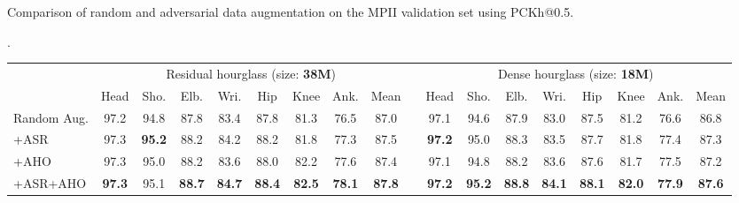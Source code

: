 \documentclass[10pt,twocolumn,letterpaper]{article}
\begin{document}
\centering
\caption{Comparison of random and adversarial data augmentation on the MPII validation set using PCKh@0.5.}
\vspace{-4pt}
\label{tab:soa_compare}.
\setlength\tabcolsep{3pt}
\begin{tabular}{l c c c c c c c c c c c c c c c c c}
\toprule
& \multicolumn{8}{c}{Residual hourglass (size: \textbf{38M})} & & \multicolumn{8}{c}{Dense hourglass (size: \textbf{18M})} \\
\cline{2-9} \cline{11-18} 
& Head & Sho. & Elb. & Wri. & Hip & Knee & Ank. & Mean & & Head & Sho. & Elb. & Wri. & Hip & Knee & Ank. & Mean \\
\cline{2-9} \cline{11-18}
Random Aug. &97.2 & 94.8 & 87.8 & 83.4 & 87.8 & 81.3 & 76.5 & 87.0 && 97.1 & 94.6 & 87.9 & 83.0 & 87.5 & 81.2 & 76.6 & 86.8\\
+ASR &97.3 & \textbf{95.2} & 88.2 & 84.2 & 88.2 & 81.8 & 77.3 & 87.5 && {\bf 97.2} & 95.0 & 88.3 & 83.5 & 87.7 & 81.8 & 77.4 & 87.3\\
+AHO &97.3 & 95.0 & 88.2 & 83.6 & 88.0 & 82.2 & 77.6 & 87.4 && 97.1 & 94.8 & 88.2 & 83.6 & 87.6 & 81.7 & 77.5 & 87.2\\
+ASR+AHO &\textbf{97.3} & 95.1 & \textbf{88.7} & \textbf{84.7} & \textbf{88.4} & \textbf{82.5} & \textbf{78.1} & \textbf{87.8} && \textbf{97.2} & \textbf{95.2} & \textbf{88.8} & \textbf{84.1} & \textbf{88.1} & \textbf{82.0} & \textbf{77.9} & \textbf{87.6}\\
\bottomrule
\end{tabular}\label{tb:componentEval}
\end{document}
